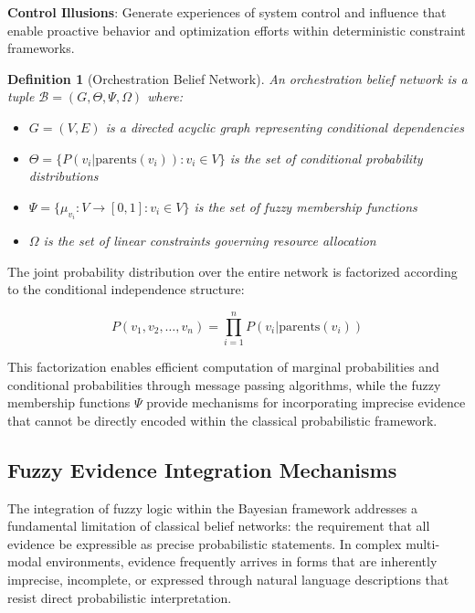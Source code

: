 \documentclass[12pt,a4paper]{article}
\newtheorem{definition}[theorem]{Definition}
\begin{document}
\textbf{Control Illusions}: Generate experiences of system control and influence that enable proactive behavior and optimization efforts within deterministic constraint frameworks.

\begin{definition}[Orchestration Belief Network]
An orchestration belief network is a tuple $\mathcal{B} = (G, \Theta, \Psi, \Omega)$ where:
\begin{itemize}
\item $G = (V, E)$ is a directed acyclic graph representing conditional dependencies
\item $\Theta = \{P(v_i | \text{parents}(v_i)) : v_i \in V\}$ is the set of conditional probability distributions
\item $\Psi = \{\mu_{v_i} : V \rightarrow [0,1] : v_i \in V\}$ is the set of fuzzy membership functions
\item $\Omega$ is the set of linear constraints governing resource allocation
\end{itemize}
\end{definition}

The joint probability distribution over the entire network is factorized according to the conditional independence structure:

\begin{equation}
P(v_1, v_2, \ldots, v_n) = \prod_{i=1}^{n} P(v_i | \text{parents}(v_i))
\end{equation}

This factorization enables efficient computation of marginal probabilities and conditional probabilities through message passing algorithms, while the fuzzy membership functions $\Psi$ provide mechanisms for incorporating imprecise evidence that cannot be directly encoded within the classical probabilistic framework.

\subsection{Fuzzy Evidence Integration Mechanisms}

The integration of fuzzy logic within the Bayesian framework addresses a fundamental limitation of classical belief networks: the requirement that all evidence be expressible as precise probabilistic statements. In complex multi-modal environments, evidence frequently arrives in forms that are inherently imprecise, incomplete, or expressed through natural language descriptions that resist direct probabilistic interpretation.
\end{document}
